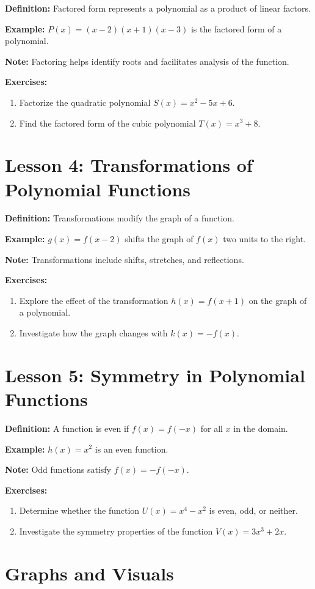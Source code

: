 \documentclass{article}
\newcommand{\colorsection}[1]{\section*{\textcolor{lessoncolor}{#1}}}
\begin{document}
\textbf{Definition:} Factored form represents a polynomial as a product of linear factors.

\textbf{Example:} \( P(x) = (x - 2)(x + 1)(x - 3) \) is the factored form of a polynomial.

\textbf{Note:} Factoring helps identify roots and facilitates analysis of the function.

\textbf{Exercises:}
\begin{enumerate}
    \item Factorize the quadratic polynomial \( S(x) = x^2 - 5x + 6 \).
    \item Find the factored form of the cubic polynomial \( T(x) = x^3 + 8 \).
\end{enumerate}

\colorsection{Lesson 4: Transformations of Polynomial Functions}

\textbf{Definition:} Transformations modify the graph of a function.

\textbf{Example:} \( g(x) = f(x - 2) \) shifts the graph of \( f(x) \) two units to the right.

\textbf{Note:} Transformations include shifts, stretches, and reflections.

\textbf{Exercises:}
\begin{enumerate}
    \item Explore the effect of the transformation \( h(x) = f(x + 1) \) on the graph of a polynomial.
    \item Investigate how the graph changes with \( k(x) = -f(x) \).
\end{enumerate}

\colorsection{Lesson 5: Symmetry in Polynomial Functions}

\textbf{Definition:} A function is even if \( f(x) = f(-x) \) for all \( x \) in the domain.

\textbf{Example:} \( h(x) = x^2 \) is an even function.

\textbf{Note:} Odd functions satisfy \( f(x) = -f(-x) \).

\textbf{Exercises:}
\begin{enumerate}
    \item Determine whether the function \( U(x) = x^4 - x^2 \) is even, odd, or neither.
    \item Investigate the symmetry properties of the function \( V(x) = 3x^3 + 2x \).
\end{enumerate}

\colorsection{Graphs and Visuals}
\end{document}
